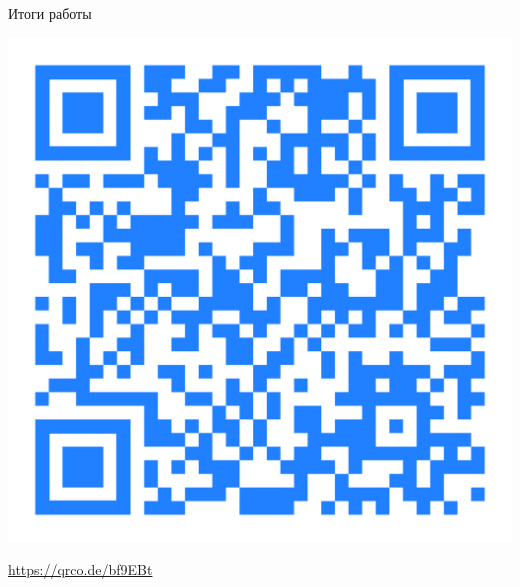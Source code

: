 \documentclass[14pt,aspectratio=169,hyperref={pdftex,unicode},xcolor=dvipsnames]{beamer}
\begin{document}
\begin{frame}{Итоги работы}
\begin{minipage}{0.5\textwidth}
\begin{center}
\includegraphics[scale=0.03]{./assets/booklet-qr.pdf}

{\small \url{https://qrco.de/bf9EBt}}

\end{center}
\end{minipage}

\end{frame}
\end{document}
